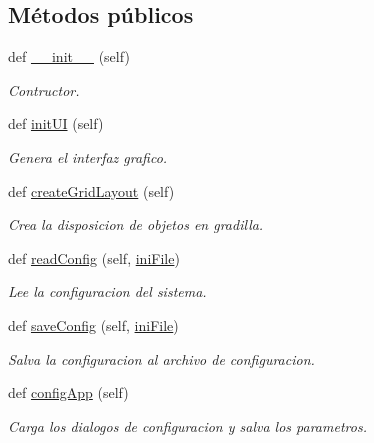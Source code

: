 \subsection*{Métodos públicos}
\begin{DoxyCompactItemize}
\item 
def \mbox{\hyperlink{classfacepi_1_1_face_pi_a68ec1ba24536fdb7cc03bc0b6f7a2bee}{\+\_\+\+\_\+init\+\_\+\+\_\+}} (self)
\begin{DoxyCompactList}\small\item\em Contructor. \end{DoxyCompactList}\item 
def \mbox{\hyperlink{classfacepi_1_1_face_pi_ad558e4b8c0cf5a01e4eb8ea7aad5cd77}{init\+UI}} (self)
\begin{DoxyCompactList}\small\item\em Genera el interfaz grafico. \end{DoxyCompactList}\item 
def \mbox{\hyperlink{classfacepi_1_1_face_pi_a18271336c0cf8270a1f1a50acb4b4953}{create\+Grid\+Layout}} (self)
\begin{DoxyCompactList}\small\item\em Crea la disposicion de objetos en gradilla. \end{DoxyCompactList}\item 
def \mbox{\hyperlink{classfacepi_1_1_face_pi_a966fe4796c56e70b656ccd92df60cbb9}{read\+Config}} (self, \mbox{\hyperlink{classfacepi_1_1_face_pi_a49127c31ef994508911027e13dada2ad}{ini\+File}})
\begin{DoxyCompactList}\small\item\em Lee la configuracion del sistema. \end{DoxyCompactList}\item 
def \mbox{\hyperlink{classfacepi_1_1_face_pi_ae6fb3ad150c4edf520d7a6e438af4cd8}{save\+Config}} (self, \mbox{\hyperlink{classfacepi_1_1_face_pi_a49127c31ef994508911027e13dada2ad}{ini\+File}})
\begin{DoxyCompactList}\small\item\em Salva la configuracion al archivo de configuracion. \end{DoxyCompactList}\item 
def \mbox{\hyperlink{classfacepi_1_1_face_pi_a6ef1408ba24ad470f358594e60b9a85a}{config\+App}} (self)
\begin{DoxyCompactList}\small\item\em Carga los dialogos de configuracion y salva los parametros. \end{DoxyCompactList}\item 

\end{DoxyCompactItemize}
